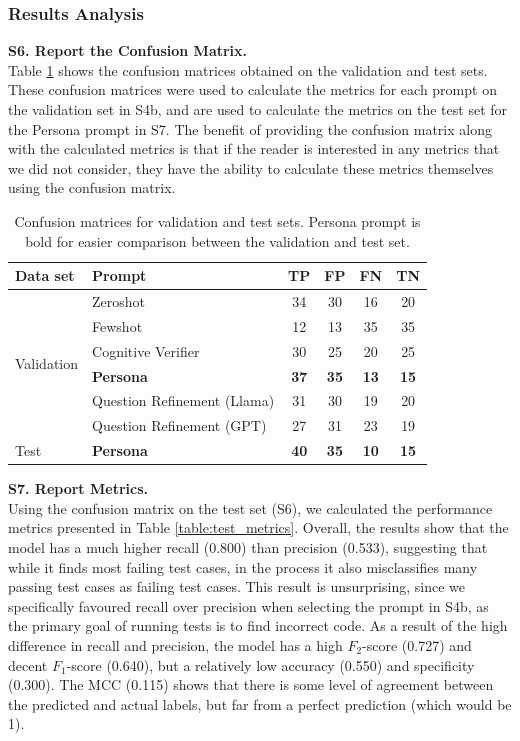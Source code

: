 \documentclass[a4paper]{article}
\begin{document}
\subsubsection{Results Analysis}

\textbf{S6. Report the Confusion Matrix.}\\
Table \ref{table:confusion_matrix} shows the confusion matrices obtained on the validation and test sets. These confusion matrices were used to calculate the metrics for each prompt on the validation set in S4b, and are used to calculate the metrics on the test set for the Persona prompt in S7. The benefit of providing the confusion matrix along with the calculated metrics is that if the reader is interested in any metrics that we did not consider, they have the ability to calculate these metrics themselves using the confusion matrix. 
\begin{table}[H]
 	\caption{Confusion matrices for validation and test sets. Persona prompt is bold for easier comparison between the validation and test set.}
 	\label{table:confusion_matrix}
	\begin{tabular}{|l|l|c|c|c|c|}
		\hline
		\textbf{Data set} & \textbf{Prompt} & \textbf{TP} & \textbf{FP} & \textbf{FN} & \textbf{TN} \\
		\hline
		\multirow{6}{*}{Validation}
		& Zeroshot & 34 & 30 & 16 & 20 \\
		& Fewshot & 12 & 13 & 35 & 35 \\
		& Cognitive Verifier & 30 & 25 & 20 & 25 \\
		& \textbf{Persona} & \textbf{37} & \textbf{35} & \textbf{13} & \textbf{15} \\
		& Question Refinement (Llama) & 31 & 30 & 19 & 20 \\
		& Question Refinement (GPT) & 27 & 31 & 23 & 19 \\
		\hline
		Test &\textbf{Persona} & \textbf{40} & \textbf{35} & \textbf{10} & \textbf{15} \\
		\hline
	\end{tabular}
\end{table}

\textbf{S7. Report Metrics.}\\
Using the confusion matrix on the test set (S6), we calculated the performance metrics presented in Table \ref{table:test_metrics}. Overall, the results show that the model has a much higher recall (0.800) than precision (0.533), suggesting that while it finds most failing test cases, in the process it also misclassifies many passing test cases as failing test cases. This result is unsurprising, since we specifically favoured recall over precision when selecting the prompt in S4b, as the primary goal of running tests is to find incorrect code. As a result of the high difference in recall and precision, the model has a high $F_2$-score (0.727) and decent $F_1$-score (0.640), but a relatively low accuracy (0.550) and specificity (0.300). The MCC (0.115) shows that there is some level of agreement between the predicted and actual labels, but far from a perfect prediction (which would be 1).
\end{document}
